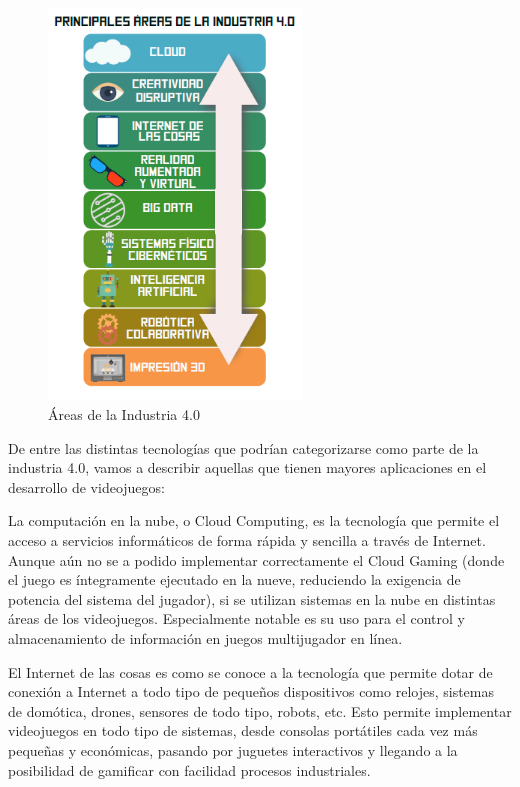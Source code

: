\begin{figure}[h]
    \centering
    \includegraphics[width=0.6\textwidth]{images/estadodelarte/mercado/tabla-web-4}
    \caption{Áreas de la Industria 4.0}
\end{figure}

De entre las distintas tecnologías que podrían categorizarse como parte de la industria 4.0, vamos a describir aquellas que tienen mayores aplicaciones en el desarrollo de videojuegos:

La computación en la nube, o Cloud Computing, es la tecnología que permite el acceso a servicios informáticos de forma rápida y sencilla a través de Internet. Aunque aún no se a podido implementar correctamente el Cloud Gaming (donde el juego es íntegramente ejecutado en la nueve, reduciendo la exigencia de potencia del sistema del jugador), si se utilizan sistemas en la nube en distintas áreas de los videojuegos. Especialmente notable es su uso para el control y almacenamiento de información en juegos multijugador en línea.

El Internet de las cosas es como se conoce a la tecnología que permite dotar de conexión a Internet a todo tipo de pequeños dispositivos como relojes, sistemas de domótica, drones, sensores de todo tipo, robots, etc. Esto permite implementar videojuegos en todo tipo de sistemas, desde consolas portátiles cada vez más pequeñas y económicas, pasando por juguetes interactivos y llegando a la posibilidad de gamificar con facilidad procesos industriales.

